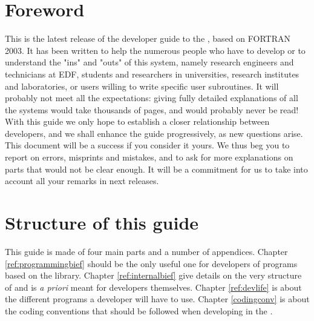 %
\chapter{Foreword}
%
%
This is the latest release of the developer guide to the \telemacsystem, based
on FORTRAN 2003. It has been written to help the numerous people who have to
develop or to understand the "ins" and "outs" of this system, namely research
engineers and technicians at EDF, students and researchers in universities,
research institutes and laboratories, or users willing to write specific user
subroutines. It will probably not meet all the expectations: giving fully
detailed explanations of all the systems would take thousands of pages, and
would probably never be read! With this guide we only hope to establish a
closer relationship between developers, and we shall enhance the guide
progressively, as new questions arise. This document will be a success if you
consider it yours. We thus beg you to report on errors, misprints and mistakes,
and to ask for more explanations on parts that would not be clear enough. It
will be a commitment for us to take into account all your remarks in next
releases.
%
%
\chapter{Structure of this guide}
%
%
This guide is made of four main parts and a number of appendices. Chapter
\ref{ref:programmingbief} should be the only useful one for developers of
programs based on the \bief library.  Chapter \ref{ref:internalbief} give
details on the very structure of \bief and is \textit{a priori} meant for \bief
developers themselves. Chapter \ref{ref:devlife} is about the different programs
a developer will have to use. Chapter \ref{codingconv} is about the coding
conventions that should be followed when developing in the \telemacsystem.

